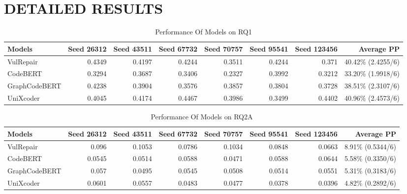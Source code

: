 \onecolumn
\section{DETAILED RESULTS}
%
%
%
\begin{table}[H]
\centering
  \caption{Performance Of Models on RQ1}
  \label{Appendices:RQ1}
  \begin{tabular}{|l|r|r|r|r|r|r|r|}
    \hline
    Models          & Seed 26312 & Seed 43511 & Seed 67732 & Seed 70757 & Seed 95541 & Seed 123456 & Average PP\\
    \hline
    VulRepair       & 0.4349    & 0.4197 & 0.4244 & 0.3511 & 0.4244 & 0.371  & 40.42\% (2.4255/6)\\
    \hline
    CodeBERT        & 0.3294    & 0.3687 & 0.3406 & 0.2327 & 0.3992 & 0.3212 & 33.20\% (1.9918/6)\\
    \hline
    GraphCodeBERT   & 0.4238    & 0.3904 & 0.3576 & 0.3857 & 0.3804 & 0.3728 & 38.51\% (2.3107/6)\\
    \hline
    UniXcoder       & 0.4045    & 0.4174 & 0.4467 & 0.3986 & 0.3499 & 0.4402 & 40.96\% (2.4573/6)\\
    \hline
  \end{tabular}
\end{table}
%
%
%
\begin{table}[H]
\centering
  \caption{Performance Of Models on RQ2A}
  \label{Appendices:RQ2A}
  \begin{tabular}{|l|r|r|r|r|r|r|r|}
    \hline
    Models          & Seed 26312 & Seed 43511 & Seed 67732 & Seed 70757 & Seed 95541 & Seed 123456 & Average PP\\
    \hline
    VulRepair       & 0.096  & 0.1053 & 0.0786 & 0.1034 & 0.0848 & 0.0663 & 8.91\% (0.5344/6)\\
    \hline
    CodeBERT        & 0.0545 & 0.0514 & 0.0588 & 0.0471 & 0.0588 & 0.0644 & 5.58\% (0.3350/6)\\
    \hline
    GraphCodeBERT   & 0.057  & 0.0495 & 0.0545 & 0.0508 & 0.0514 & 0.0551 & 5.31\% (0.3183/6)\\
    \hline
    UniXcoder       & 0.0601 & 0.0557 & 0.0483 & 0.0477 & 0.0378 & 0.0396 & 4.82\% (0.2892/6)\\
    \hline
  \end{tabular}
\end{table}
%
%
%
